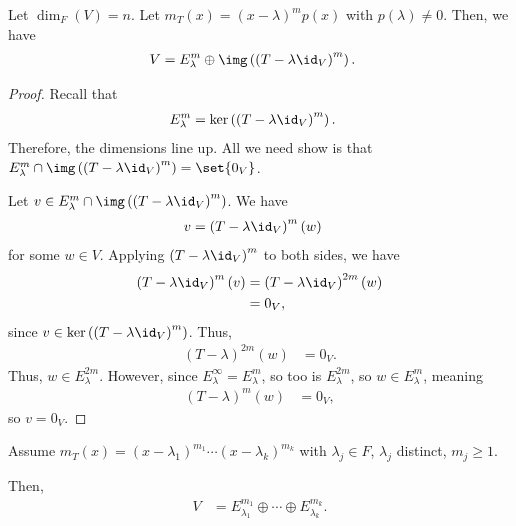 \documentclass[10pt]{mypackage}
\begin{document}
\begin{lemma}
  Let $\dim_{F}\left(V\right) = n$. Let $m_T(x) = \left(x-\lambda\right)^mp(x)$ with $p\left(\lambda\right)\neq 0$. Then, we have
  \begin{align*}
    V &= E_{\lambda}^{m} \oplus \img\left(\left(T-\lambda\id_V\right)^m\right).
  \end{align*}
\end{lemma}
\begin{proof}
  Recall that
  \begin{align*}
    E_{\lambda}^{m} &= \ker\left(\left(T-\lambda\id_{V}\right)^m\right).
  \end{align*}
  Therefore, the dimensions line up. All we need show is that $E_{\lambda}^{m}\cap \img\left(\left(T-\lambda\id_V\right)^m\right) = \set{0_V}$.\newline

  Let $v\in E_{\lambda}^{m}\cap \img\left(\left(T-\lambda\id_V\right)^m\right)$. We have
  \begin{align*}
    v &= \left(T-\lambda\id_V\right)^{m}\left(w\right)
  \end{align*}
  for some $w\in V$. Applying $\left(T-\lambda\id_V\right)^{m}$ to both sides, we have
  \begin{align*}
    \left(T-\lambda\id_V\right)^{m}\left(v\right) &= \left(T-\lambda\id_V\right)^{2m}(w)\\
                                                  &=0_V,
  \end{align*}
  since $v\in \ker\left(\left(T-\lambda\id_V\right)^m\right)$. Thus,
  \begin{align*}
    \left(T-\lambda\right)^{2m}(w) &= 0_V.
  \end{align*}
  Thus, $w\in E_{\lambda}^{2m}$. However, since $E_{\lambda}^{\infty} = E_{\lambda}^{m}$, so too is $E_{\lambda}^{2m}$, so $w\in E_{\lambda}^{m}$, meaning
  \begin{align*}
    \left(T-\lambda\right)^{m}\left(w\right) &= 0_V,
  \end{align*}
  so $v = 0_V$.
\end{proof}
\begin{theorem}
  Assume $m_T(x) = \left(x-\lambda_1\right)^{m_1}\cdots\left(x-\lambda_k\right)^{m_k}$ with $\lambda_j\in F$, $\lambda_j$ distinct, $m_j\geq 1$.\newline

  Then, 
  \begin{align*}
    V &= E_{\lambda_1}^{m_1} \oplus \cdots \oplus E_{\lambda_k}^{m_k}.
  \end{align*}
\end{theorem}
\end{document}
